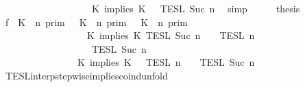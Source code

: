 \begin{isabellebody}
\ \ \ \ \ \ \ \ \ \ \ \ \ \ \ \ \ {\isasyminter}\ {\isasymlbrakk}{\isasymlbrakk}\ {\isacharparenleft}K\ implies\ K\ {\isacharhash}\ {\isasymPhi}\ {\isasymrbrakk}{\isasymrbrakk}\isactrlsub T\isactrlsub E\isactrlsub S\isactrlsub L\isactrlbsup {\isasymge}\ Suc\ n\isactrlesup {\isacartoucheclose}\ \isamarkupfalse%
\ simp\isanewline
\ \ \isamarkupfalse%
\ \isamarkupfalse%
\ {\isacharquery}thesis\isanewline
\ \ \isamarkupfalse%
\ {\isacharminus}\isanewline
\ \ \ \ \isamarkupfalse%
\ f{}{\isacharcolon}\ {\isacartoucheopen}{\isacharparenleft}{\isasymlbrakk}\ K\ {\isasymnot}{\isasymUp}\ n\ {\isasymrbrakk}\isactrlsub p\isactrlsub r\isactrlsub i\isactrlsub m\ {\isasymunion}\ {\isasymlbrakk}\ K\ {\isasymUp}\ n\ {\isasymrbrakk}\isactrlsub p\isactrlsub r\isactrlsub i\isactrlsub m\ {\isasyminter}\ {\isasymlbrakk}\ K\ {\isasymUp}\ n\ {\isasymrbrakk}\isactrlsub p\isactrlsub r\isactrlsub i\isactrlsub m{\isacharparenright}\isanewline
\ \ \ \ \ \ \ \ \ \ \ \ \ \ \ \ {\isasyminter}\ {\isasymlbrakk}\ K\ implies\ K\ {\isasymrbrakk}\isactrlsub T\isactrlsub E\isactrlsub S\isactrlsub L\isactrlbsup {\isasymge}\ Suc\ n\isactrlesup \ {\isasyminter}\ {\isacharparenleft}{\isasymlbrakk}{\isasymlbrakk}\ {\isasymPsi}\ {\isasymrbrakk}{\isasymrbrakk}\isactrlsub T\isactrlsub E\isactrlsub S\isactrlsub L\isactrlbsup {\isasymge}\ n\isactrlesup \isanewline
\ \ \ \ \ \ \ \ \ \ \ \ \ \ \ \ {\isasyminter}\ {\isasymlbrakk}{\isasymlbrakk}\ {\isasymPhi}\ {\isasymrbrakk}{\isasymrbrakk}\isactrlsub T\isactrlsub E\isactrlsub S\isactrlsub L\isactrlbsup {\isasymge}\ Suc\ n\isactrlesup {\isacharparenright}\isanewline
\ \ \ \ \ \ \ \ \ \ \ \ \ \ {\isacharequal}\ {\isasymlbrakk}{\isasymlbrakk}\ {\isacharparenleft}K\ implies\ K\ {\isacharhash}\ {\isasymPsi}\ {\isasymrbrakk}{\isasymrbrakk}\isactrlsub T\isactrlsub E\isactrlsub S\isactrlsub L\isactrlbsup {\isasymge}\ n\isactrlesup \ {\isasyminter}\ {\isasymlbrakk}{\isasymlbrakk}\ {\isasymPhi}\ {\isasymrbrakk}{\isasymrbrakk}\isactrlsub T\isactrlsub E\isactrlsub S\isactrlsub L\isactrlbsup {\isasymge}\ Suc\ n\isactrlesup {\isacartoucheclose}\isanewline
\ \ \ \ \ \ \isamarkupfalse%
\ TESL{\isacharunderscore}interp{\isacharunderscore}stepwise{\isacharunderscore}implies{\isacharunderscore}coind{\isacharunderscore}unfold\isanewline

\end{isabellebody}
